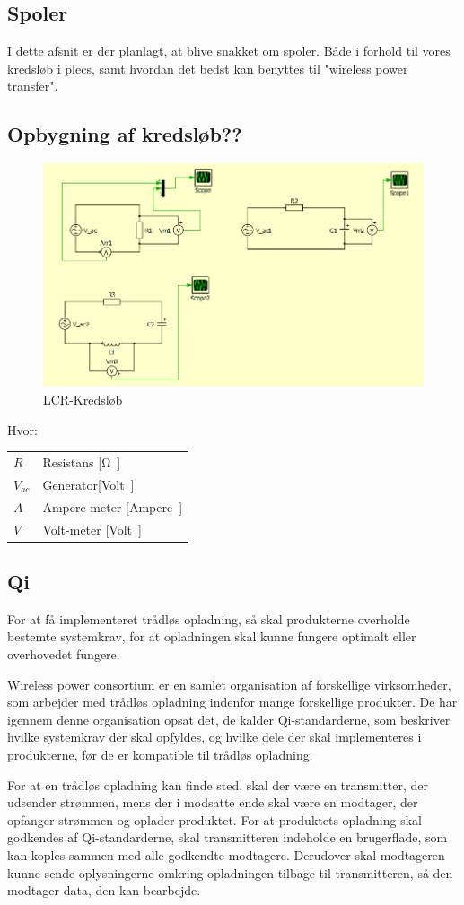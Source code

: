 \subsection{Spoler}
I dette afsnit er der planlagt, at blive snakket om spoler. Både i forhold til vores kredsløb i plecs, samt hvordan det bedst kan benyttes til "wireless power transfer".
\newpage
\subsection{Opbygning af kredsløb??}
\begin{figure}[htbp]
	\centering
	\includegraphics[width=1\textwidth]{../Vildledning/Schematics/Eks1_LCR.png}
	\caption{LCR-Kredsløb}
\end{figure}

Hvor:
\begin{table}[H]
	\begin{tabular}{l|l}
	$R$     & Resistans [\si \ohm] \\
	$V_{ac}$ 	   &  Generator[\si Volt] \\
	$A$ 	   & Ampere-meter [\si Ampere] \\
	$V$			& Volt-meter [\si Volt]
	\end{tabular}
\end{table}

\subsection{Qi}
For at få implementeret trådløs opladning, så skal produkterne overholde bestemte systemkrav, for at opladningen skal kunne fungere optimalt eller overhovedet fungere.

Wireless power consortium er en samlet organisation af forskellige virksomheder, som arbejder med trådløs opladning indenfor mange forskellige produkter. De har igennem denne organisation opsat det, de kalder Qi-standarderne, som beskriver hvilke systemkrav der skal opfyldes, og hvilke dele der skal implementeres i produkterne, før de er kompatible til trådløs opladning.

For at en trådløs opladning kan finde sted, skal der være en transmitter, der udsender strømmen, mens der i modsatte ende skal være en modtager, der opfanger strømmen og oplader produktet. For at produktets opladning skal godkendes af Qi-standarderne, skal transmitteren indeholde en brugerflade, som kan koples sammen med alle godkendte modtagere. Derudover skal modtageren kunne sende oplysningerne omkring opladningen tilbage til transmitteren, så den modtager data, den kan bearbejde.
